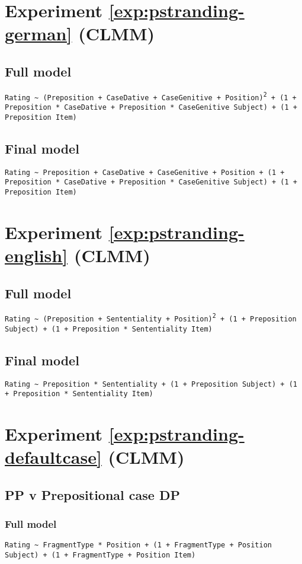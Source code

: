 \section*{Experiment \ref{exp:pstranding-german} (CLMM)}
\subsection*{Full model}
\texttt{Rating \textasciitilde {} (Preposition + CaseDative + CaseGenitive + Position)\textsuperscript{2} + (1 + Preposition * CaseDative + Preposition * CaseGenitive  {}\textbar {} Subject) + (1 + Preposition{} \textbar {} Item)}

\subsection*{Final model}
\texttt{Rating \textasciitilde {} Preposition + CaseDative + CaseGenitive + Position + (1 + Preposition * CaseDative + Preposition * CaseGenitive  {}\textbar {} Subject) + (1 + Preposition{} \textbar {} Item)}

\section*{Experiment \ref{exp:pstranding-english} (CLMM)}
\subsection*{Full model}
\texttt{Rating \textasciitilde {} (Preposition + Sententiality + Position)\textsuperscript{2} + (1 + Preposition  {}\textbar {} Subject) + (1 + Preposition * Sententiality  {}\textbar {} Item)}

\subsection*{Final model}
\texttt{Rating \textasciitilde {} Preposition * Sententiality + (1 + Preposition  {}\textbar {} Subject) + (1 + Preposition * Sententiality  {}\textbar {} Item)}

\section*{Experiment \ref{exp:pstranding-defaultcase} (CLMM)}
\subsection*{PP v Prepositional case DP}
\subsubsection*{Full model}
\texttt{Rating \textasciitilde {} FragmentType * Position + (1 + FragmentType + Position{} \textbar {} Subject) + (1 + FragmentType + Position{} \textbar {} Item)}

